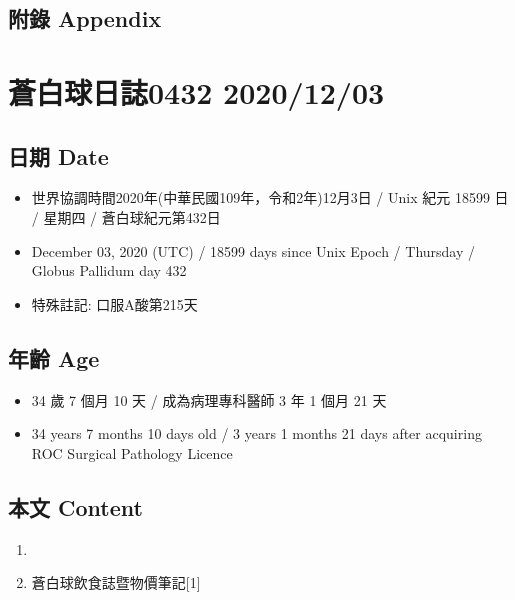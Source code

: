 \documentclass[a5paper, 11pt
]{book}
\providecommand{\tightlist}{%
  \setlength{\itemsep}{0pt}\setlength{\parskip}{0pt}}
\begin{document}
\hypertarget{ux9644ux9304-appendix-1}{%
\subsection{附錄 Appendix}\label{ux9644ux9304-appendix-1}}

\hypertarget{ux84bcux767dux7403ux65e5ux8a8c0432-20201203}{%
\section{蒼白球日誌0432
2020/12/03}\label{ux84bcux767dux7403ux65e5ux8a8c0432-20201203}}

\hypertarget{ux65e5ux671f-date-2}{%
\subsection{日期 Date}\label{ux65e5ux671f-date-2}}

\begin{itemize}
\tightlist
\item
  世界協調時間2020年(中華民國109年，令和2年)12月3日 / Unix 紀元 18599 日
  / 星期四 / 蒼白球紀元第432日
\item
  December 03, 2020 (UTC) / 18599 days since Unix Epoch / Thursday /
  Globus Pallidum day 432
\item
  特殊註記: 口服A酸第215天
\end{itemize}

\hypertarget{ux5e74ux9f61-age-2}{%
\subsection{年齡 Age}\label{ux5e74ux9f61-age-2}}

\begin{itemize}
\tightlist
\item
  34 歲 7 個月 10 天 / 成為病理專科醫師 3 年 1 個月 21 天
\item
  34 years 7 months 10 days old / 3 years 1 months 21 days after
  acquiring ROC Surgical Pathology Licence
\end{itemize}

\hypertarget{ux672cux6587-content-2}{%
\subsection{本文 Content}\label{ux672cux6587-content-2}}

\begin{enumerate}
\def\labelenumi{\arabic{enumi}.}
\tightlist
\item
\item
  蒼白球飲食誌暨物價筆記{[}1{]}
\end{enumerate}
\end{document}
